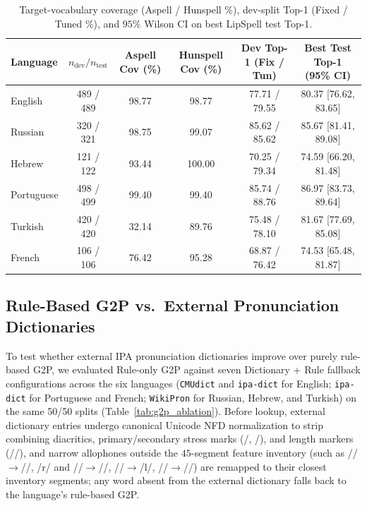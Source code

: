 \documentclass[
  journal=nlp,
  manuscript=research-article,
  year=2026,
]{cup-journal}
\begin{document}
\begin{table}[ht]
\centering
\scriptsize
\caption{Target-vocabulary coverage (Aspell / Hunspell \%), dev-split Top-1 (Fixed / Tuned \%), and $95\%$ Wilson CI on best LipSpell test Top-1.}
\label{tab:multilingual_cov}
\begin{tabular}{lccccc}
\toprule
Language & $n_{\text{dev}} / n_{\text{test}}$ & Aspell Cov (\%) & Hunspell Cov (\%) & Dev Top-1 (Fix / Tun) & Best Test Top-1 (95\% CI) \\
\midrule
English    & 489 / 489 & 98.77 & 98.77 & 77.71 / 79.55 & 80.37 [76.62, 83.65] \\
Russian    & 320 / 321 & 98.75 & 99.07 & 85.62 / 85.62 & 85.67 [81.41, 89.08] \\
Hebrew     & 121 / 122 & 93.44 & 100.00 & 70.25 / 79.34 & 74.59 [66.20, 81.48] \\
Portuguese & 498 / 499 & 99.40 & 99.40 & 85.74 / 88.76 & 86.97 [83.73, 89.64] \\
Turkish    & 420 / 420 & 32.14 & 89.76 & 75.48 / 78.10 & 81.67 [77.69, 85.08] \\
French     & 106 / 106 & 76.42 & 95.28 & 68.87 / 76.42 & 74.53 [65.48, 81.87] \\
\bottomrule
\end{tabular}
\end{table}

\subsection{Rule-Based G2P vs.\ External Pronunciation Dictionaries}
To test whether external IPA pronunciation dictionaries improve over purely rule-based G2P, we evaluated Rule-only G2P against seven Dictionary + Rule fallback configurations across the six languages (\texttt{CMUdict} and \texttt{ipa-dict} \parencite{opendictipadict} for English; \texttt{ipa-dict} for Portuguese and French; \texttt{WikiPron} \parencite{lee2020wikipron} for Russian, Hebrew, and Turkish) on the same 50/50 splits (Table~\ref{tab:g2p_ablation}). Before lookup, external dictionary entries undergo canonical Unicode NFD normalization to strip combining diacritics, primary/secondary stress marks (/\textprimstress, \textsecstress/), and length markers (/\textlengthmark/), and narrow allophones outside the $45$-segment feature inventory (such as /\textinvscr/$\rightarrow$/\textturnr/, /r/ and //$\rightarrow$/\textfishhookr/, /\textltilde/$\rightarrow$/l/, /\textgamma/$\rightarrow$//) are remapped to their closest inventory segments; any word absent from the external dictionary falls back to the language's rule-based G2P.
\end{document}
